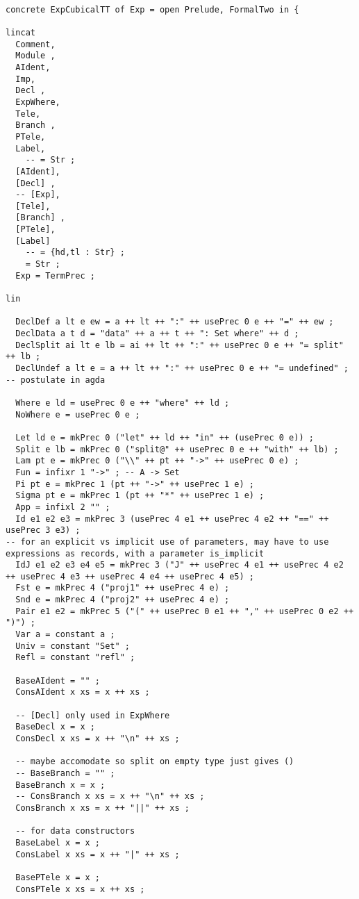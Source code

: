 \documentclass[11pt, a4paper]{article}
\begin{document}
\begin{verbatim}

concrete ExpCubicalTT of Exp = open Prelude, FormalTwo in {

lincat 
  Comment,
  Module ,
  AIdent,
  Imp,
  Decl ,
  ExpWhere,
  Tele,
  Branch ,
  PTele,
  Label,
    -- = Str ;
  [AIdent],
  [Decl] ,
  -- [Exp],
  [Tele],
  [Branch] ,
  [PTele],
  [Label]
    -- = {hd,tl : Str} ;
    = Str ;
  Exp = TermPrec ;

lin

  DeclDef a lt e ew = a ++ lt ++ ":" ++ usePrec 0 e ++ "=" ++ ew ;
  DeclData a t d = "data" ++ a ++ t ++ ": Set where" ++ d ;
  DeclSplit ai lt e lb = ai ++ lt ++ ":" ++ usePrec 0 e ++ "= split" ++ lb ;
  DeclUndef a lt e = a ++ lt ++ ":" ++ usePrec 0 e ++ "= undefined" ; -- postulate in agda

  Where e ld = usePrec 0 e ++ "where" ++ ld ;
  NoWhere e = usePrec 0 e ;

  Let ld e = mkPrec 0 ("let" ++ ld ++ "in" ++ (usePrec 0 e)) ;
  Split e lb = mkPrec 0 ("split@" ++ usePrec 0 e ++ "with" ++ lb) ;
  Lam pt e = mkPrec 0 ("\\" ++ pt ++ "->" ++ usePrec 0 e) ;
  Fun = infixr 1 "->" ; -- A -> Set
  Pi pt e = mkPrec 1 (pt ++ "->" ++ usePrec 1 e) ;
  Sigma pt e = mkPrec 1 (pt ++ "*" ++ usePrec 1 e) ;
  App = infixl 2 "" ;
  Id e1 e2 e3 = mkPrec 3 (usePrec 4 e1 ++ usePrec 4 e2 ++ "==" ++ usePrec 3 e3) ;
-- for an explicit vs implicit use of parameters, may have to use expressions as records, with a parameter is_implicit
  IdJ e1 e2 e3 e4 e5 = mkPrec 3 ("J" ++ usePrec 4 e1 ++ usePrec 4 e2 ++ usePrec 4 e3 ++ usePrec 4 e4 ++ usePrec 4 e5) ;
  Fst e = mkPrec 4 ("proj1" ++ usePrec 4 e) ;
  Snd e = mkPrec 4 ("proj2" ++ usePrec 4 e) ;
  Pair e1 e2 = mkPrec 5 ("(" ++ usePrec 0 e1 ++ "," ++ usePrec 0 e2 ++ ")") ;
  Var a = constant a ;
  Univ = constant "Set" ;
  Refl = constant "refl" ;

  BaseAIdent = "" ;
  ConsAIdent x xs = x ++ xs ;

  -- [Decl] only used in ExpWhere
  BaseDecl x = x ;
  ConsDecl x xs = x ++ "\n" ++ xs ;

  -- maybe accomodate so split on empty type just gives () 
  -- BaseBranch = "" ;
  BaseBranch x = x ;
  -- ConsBranch x xs = x ++ "\n" ++ xs ;
  ConsBranch x xs = x ++ "||" ++ xs ;

  -- for data constructors
  BaseLabel x = x ;
  ConsLabel x xs = x ++ "|" ++ xs ; 

  BasePTele x = x ;
  ConsPTele x xs = x ++ xs ;


\end{verbatim}
\end{document}
